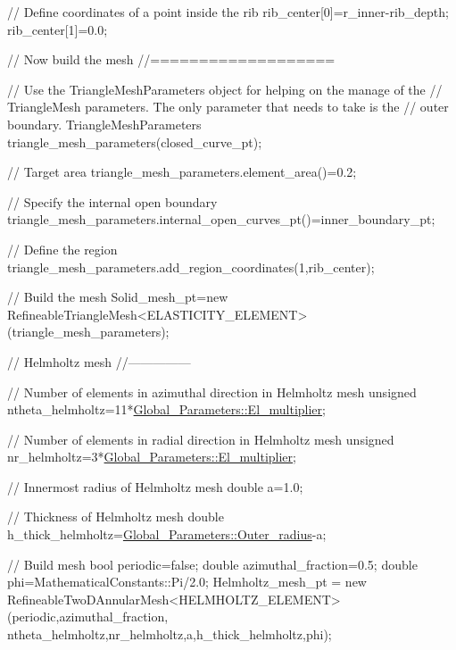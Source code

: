 \begin{DoxyCodeInclude}
 \textcolor{comment}{// Define coordinates of a point inside the rib}
 rib\_center[0]=r\_inner-rib\_depth;
 rib\_center[1]=0.0;


 \textcolor{comment}{// Now build the mesh}
 \textcolor{comment}{//===================}

 \textcolor{comment}{// Use the TriangleMeshParameters object for helping on the manage of the}
 \textcolor{comment}{// TriangleMesh parameters. The only parameter that needs to take is the}
 \textcolor{comment}{// outer boundary.}
 TriangleMeshParameters triangle\_mesh\_parameters(closed\_curve\_pt);

 \textcolor{comment}{// Target area}
 triangle\_mesh\_parameters.element\_area()=0.2;

 \textcolor{comment}{// Specify the internal open boundary}
 triangle\_mesh\_parameters.internal\_open\_curves\_pt()=inner\_boundary\_pt;

 \textcolor{comment}{// Define the region}
 triangle\_mesh\_parameters.add\_region\_coordinates(1,rib\_center);
 
 \textcolor{comment}{// Build the mesh}
 Solid\_mesh\_pt=\textcolor{keyword}{new} 
  RefineableTriangleMesh<ELASTICITY\_ELEMENT>(triangle\_mesh\_parameters);
 
 \textcolor{comment}{// Helmholtz mesh}
 \textcolor{comment}{//---------------}

 \textcolor{comment}{// Number of elements in azimuthal direction in Helmholtz mesh}
 \textcolor{keywordtype}{unsigned} ntheta\_helmholtz=11*\hyperlink{namespaceGlobal__Parameters_a35d5d2ecfff0cec6150a5dc79e5c1ad1}{Global\_Parameters::El\_multiplier};

 \textcolor{comment}{// Number of elements in radial direction in Helmholtz mesh}
 \textcolor{keywordtype}{unsigned} nr\_helmholtz=3*\hyperlink{namespaceGlobal__Parameters_a35d5d2ecfff0cec6150a5dc79e5c1ad1}{Global\_Parameters::El\_multiplier};

 \textcolor{comment}{// Innermost radius of Helmholtz mesh}
 \textcolor{keywordtype}{double} a=1.0;
 
 \textcolor{comment}{// Thickness of Helmholtz mesh}
 \textcolor{keywordtype}{double} h\_thick\_helmholtz=\hyperlink{namespaceGlobal__Parameters_a88ded445ecd7bd89701409e68fd0b900}{Global\_Parameters::Outer\_radius}-a;

 \textcolor{comment}{// Build mesh}
 \textcolor{keywordtype}{bool} periodic=\textcolor{keyword}{false};
 \textcolor{keywordtype}{double} azimuthal\_fraction=0.5;
 \textcolor{keywordtype}{double} phi=MathematicalConstants::Pi/2.0;
 Helmholtz\_mesh\_pt = \textcolor{keyword}{new} 
  RefineableTwoDAnnularMesh<HELMHOLTZ\_ELEMENT>
  (periodic,azimuthal\_fraction,
   ntheta\_helmholtz,nr\_helmholtz,a,h\_thick\_helmholtz,phi);


\end{DoxyCodeInclude}
